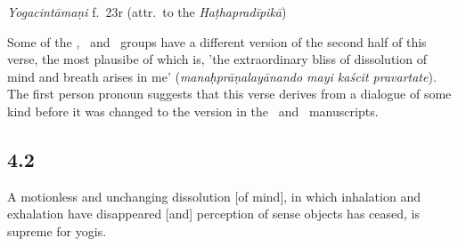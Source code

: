 \begin{ekdosis}
\begin{testimonia}[hp04_001_1]
\emph{Yogacintāmaṇi} f.~23r (attr.~to the \emph{Haṭhapradīpikā})
\begin{versinnote}
\end{versinnote}
\end{testimonia}

\begin{philcomm}[hp04_001_1]
Some of the \textbeta, \textepsilon\ and \texteta\ groups have a different version of the second half of this verse, the most plausibe of which is, 'the extraordinary bliss of dissolution of mind and breath arises in me' (\emph{manaḥprāṇalayānando mayi kaścit pravartate}). The first person pronoun suggests that this verse derives from a dialogue of some kind before it was changed to the version in the \textgamma\ and \textdelta\ manuscripts.  
\end{philcomm}


\subsection*{4.2}
\begin{translation}[hp04_002]
A motionless and unchanging dissolution [of mind], in which inhalation and exhalation have disappeared [and] perception of sense objects has ceased, is supreme for yogis.%
\end{translation}


\end{ekdosis}
